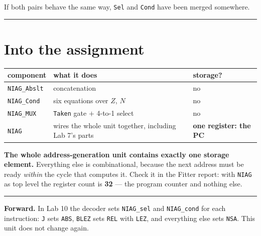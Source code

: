 \documentclass[11pt]{article}
\newcommand{\code}[1]{\texttt{#1}}
\newcommand{\hr}{\vspace{2pt}\hrule\vspace{6pt}}
\begin{document}
If both pairs behave the same way, \code{Sel} and \code{Cond} have been merged
somewhere.

\vspace{4pt}\hr

\section*{Into the assignment}

\begin{center}
\begin{tabular}{lll}
\toprule
component & what it does & storage? \\
\midrule
\code{NIAG\_Abslt} & concatenation & no \\
\code{NIAG\_Cond} & six equations over $Z$, $N$ & no \\
\code{NIAG\_MUX} & \code{Taken} gate $+$ 4-to-1 select & no \\
\code{NIAG} & wires the whole unit together, including Lab 7's parts & \textbf{one register: the PC} \\
\bottomrule
\end{tabular}
\end{center}

\textbf{The whole address-generation unit contains exactly one storage element.}
Everything else is combinational, because the next address must be ready
\emph{within} the cycle that computes it. Check it in the Fitter report: with
\code{NIAG} as top level the register count is \textbf{32} --- the program counter
and nothing else.

\vspace{6pt}
\hr
{\small \textbf{Forward.} In Lab 10 the decoder sets \code{NIAG\_sel} and
\code{NIAG\_cond} for each instruction: \code{J} sets \code{ABS}, \code{BLEZ} sets
\code{REL} with \code{LEZ}, and everything else sets \code{NSA}. This unit does
not change again.}
\end{document}
